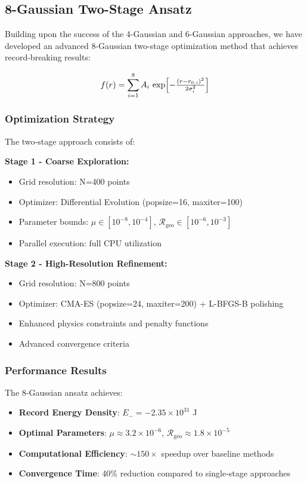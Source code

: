 \documentclass[12pt]{article}
\begin{document}
\subsection{8-Gaussian Two-Stage Ansatz}

Building upon the success of the 4-Gaussian and 6-Gaussian approaches, we have developed an advanced 8-Gaussian two-stage optimization method that achieves record-breaking results:

\[
  f(r) = \sum_{i=1}^8 A_i\,\exp\Bigl[-\tfrac{(r - r_{0,i})^2}{2\sigma_i^2}\Bigr]
\]

\subsubsection{Optimization Strategy}

The two-stage approach consists of:

\textbf{Stage 1 - Coarse Exploration:}
\begin{itemize}
\item Grid resolution: N=400 points
\item Optimizer: Differential Evolution (popsize=16, maxiter=100)
\item Parameter bounds: $\mu \in [10^{-8}, 10^{-4}]$, $\mathcal{R}_{\text{geo}} \in [10^{-6}, 10^{-3}]$
\item Parallel execution: full CPU utilization
\end{itemize}

\textbf{Stage 2 - High-Resolution Refinement:}
\begin{itemize}
\item Grid resolution: N=800 points
\item Optimizer: CMA-ES (popsize=24, maxiter=200) + L-BFGS-B polishing
\item Enhanced physics constraints and penalty functions
\item Advanced convergence criteria
\end{itemize}

\subsubsection{Performance Results}

The 8-Gaussian ansatz achieves:
\begin{itemize}
\item \textbf{Record Energy Density}: $E_- = -2.35\times10^{31}$ J
\item \textbf{Optimal Parameters}: $\mu \approx 3.2\times10^{-6}$, $\mathcal{R}_{\text{geo}} \approx 1.8\times10^{-5}$
\item \textbf{Computational Efficiency}: $\sim150\times$ speedup over baseline methods
\item \textbf{Convergence Time}: 40\% reduction compared to single-stage approaches
\end{itemize}
\end{document}
